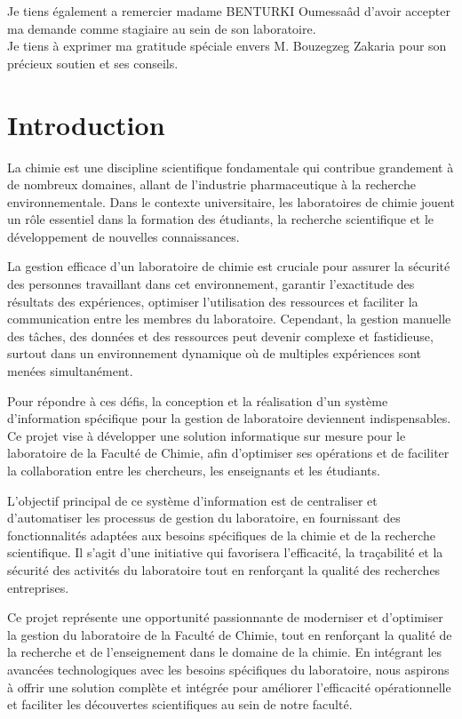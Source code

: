 \documentclass{report}
\begin{document}
Je tiens également a  remercier  madame BENTURKI Oumessaâd  d’avoir accepter ma demande comme stagiaire au sein de son laboratoire. \\


 Je tiens à exprimer ma gratitude spéciale envers M. Bouzegzeg Zakaria pour son précieux soutien et ses conseils.

\tableofcontents
\listoffigures
\listoftables
\chapter*{Introduction}
La chimie est une discipline scientifique fondamentale qui contribue grandement à de nombreux domaines, allant de l'industrie pharmaceutique à la recherche environnementale. Dans le contexte universitaire, les laboratoires de chimie jouent un rôle essentiel dans la formation des étudiants, la recherche scientifique et le développement de nouvelles connaissances.

La gestion efficace d'un laboratoire de chimie est cruciale pour assurer la sécurité des personnes travaillant dans cet environnement, garantir l'exactitude des résultats des expériences, optimiser l'utilisation des ressources et faciliter la communication entre les membres du laboratoire. Cependant, la gestion manuelle des tâches, des données et des ressources peut devenir complexe et fastidieuse, surtout dans un environnement dynamique où de multiples expériences sont menées simultanément.

Pour répondre à ces défis, la conception et la réalisation d'un système d'information spécifique pour la gestion de laboratoire deviennent indispensables. Ce projet vise à développer une solution informatique sur mesure pour le laboratoire de la Faculté de Chimie, afin d'optimiser ses opérations et de faciliter la collaboration entre les chercheurs, les enseignants et les étudiants.

L'objectif principal de ce système d'information est de centraliser et d'automatiser les processus de gestion du laboratoire, en fournissant des fonctionnalités adaptées aux besoins spécifiques de la chimie et de la recherche scientifique. Il s'agit d'une initiative qui favorisera l'efficacité, la traçabilité et la sécurité des activités du laboratoire tout en renforçant la qualité des recherches entreprises.

Ce projet représente une opportunité passionnante de moderniser et d'optimiser la gestion du laboratoire de la Faculté de Chimie, tout en renforçant la qualité de la recherche et de l'enseignement dans le domaine de la chimie. En intégrant les avancées technologiques avec les besoins spécifiques du laboratoire, nous aspirons à offrir une solution complète et intégrée pour améliorer l'efficacité opérationnelle et faciliter les découvertes scientifiques au sein de notre faculté.






\end{document}
